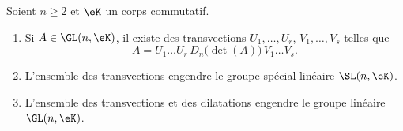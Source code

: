 \begin{proposition}      \label{PropooFDNRooWFfUDd}
	Soient \( n\geq 2\) et \( \eK\) un corps commutatif.
	\begin{enumerate}
		\item
		      Si \( A\in \GL(n,\eK)\), il existe des transvections \( U_1,\ldots, U_r\), \( V_1,\ldots, V_s\) telles que
		      \begin{equation}        \label{EQooKSQVooIpkdIE}
			      A=U_1\ldots U_r\,D_n\big( \det(A) \big)\,V_1\ldots V_s.
		      \end{equation}
		\item       \label{ITEMooLRYXooSoKRiA}
		      L'ensemble des transvections engendre le groupe spécial linéaire \( \SL(n,\eK)\).
		\item
		      L'ensemble des transvections et des dilatations engendre le groupe linéaire \( \GL(n,\eK)\).
	\end{enumerate}
\end{proposition}


